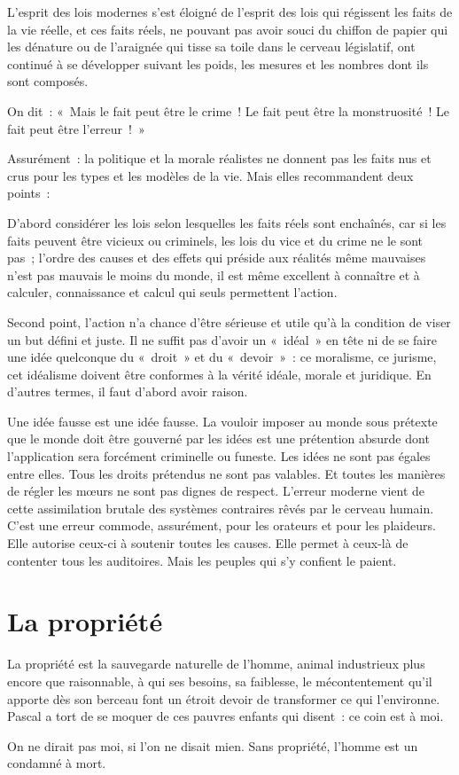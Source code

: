 \documentclass[french,twoside]{book} %
\begin{document}
\noindent L’esprit des lois modernes s’est éloigné de l’esprit des lois qui régissent les faits de la vie réelle, et ces faits réels, ne pouvant pas avoir souci du chiffon de papier qui les dénature ou de l’araignée qui tisse sa toile dans le cerveau législatif, ont continué à se développer suivant les poids, les mesures et les nombres dont ils sont composés.\par
On dit : « Mais le fait peut être le crime ! Le fait peut être la monstruosité ! Le fait peut être l’erreur ! »\par
Assurément : la politique et la morale réalistes ne donnent pas les faits nus et crus pour les types et les modèles de la vie. Mais elles recommandent deux points :\par
D’abord considérer les lois selon lesquelles les faits réels sont enchaînés, car si les faits peuvent être vicieux ou criminels, les lois du vice et du crime ne le sont pas ; l’ordre des causes et des effets qui préside aux réalités même mauvaises n’est pas mauvais le moins du monde, il est même excellent à connaître et à calculer, connaissance et calcul qui seuls permettent l’action.\par
Second point, l’action n’a chance d’être sérieuse et utile qu’à la condition de viser un but défini et juste. Il ne suffit pas d’avoir un « idéal » en tête ni de se faire une idée quelconque du « droit » et du « devoir » : ce moralisme, ce jurisme, cet idéalisme doivent être conformes à la vérité idéale, morale et juridique. En d’autres termes, il faut d’abord avoir raison.\par
Une idée fausse est une idée fausse. La vouloir imposer au monde sous prétexte que le monde doit être gouverné par les idées est une prétention absurde dont l’application sera forcément criminelle ou funeste. Les idées ne sont pas égales entre elles. Tous les droits prétendus ne sont pas valables. Et toutes les manières de régler les mœurs ne sont pas dignes de respect. L’erreur moderne vient de cette assimilation brutale des systèmes contraires rêvés par le cerveau humain. C’est une erreur commode, assurément, pour les orateurs et pour les plaideurs. Elle autorise ceux-ci à soutenir toutes les causes. Elle permet à ceux-là de contenter tous les auditoires. Mais les peuples qui s’y confient le paient.
\section[La propriété]{La propriété}
\noindent La propriété est la sauvegarde naturelle de l’homme, animal industrieux plus encore que raisonnable, à qui ses besoins, sa faiblesse, le mécontentement qu’il apporte dès son berceau font un étroit devoir de transformer ce qui l’environne. Pascal a tort de se moquer de ces pauvres enfants qui disent : ce coin est à moi.\par
On ne dirait pas moi, si l’on ne disait mien. Sans propriété, l’homme est un condamné à mort.\par
\end{document}

